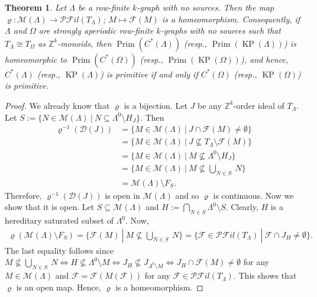 \documentclass[a4paper,reqno,12pt]{amsart}
\numberwithin{equation}{section}
\newtheorem{thm}{Theorem}[section]
\theoremstyle{definition}
\theoremstyle{remark}
\newcommand{\Prim}{\operatorname{Prim}}
\newcommand{\KP}{\operatorname{KP}}
\begin{document}
\begin{thm}\label{th TM detects primitive ideal space}
Let $\Lambda$ be a row-finite $k$-graph with no sources. Then the map $\varrho:\mathscr{M}(\Lambda)\longrightarrow \mathscr{P}\mathscr{F}il(T_\Lambda)$; $M\longmapsto \mathcal{F}(M)$ is a homeomorphism. Consequently, if $\Lambda$ and $\Omega$ are strongly aperiodic row-finite $k$-graphs with no sources such that $T_\Lambda\cong T_\Omega$ as $\mathbb{Z}^k$-monoids, then $\Prim(C^*(\Lambda))$ (resp., $\Prim(\KP(\Lambda))$) is homeomorphic to $\Prim(C^*(\Omega))$ (resp., $\Prim(\KP(\Omega))$), and hence, $C^*(\Lambda)$ (resp., $\KP(\Lambda)$) is primitive if and only if $C^*(\Omega)$ (resp., $\KP(\Omega)$) is primitive. 
\end{thm}
\begin{proof}
We already know that $\varrho$ is a bijection. Let $J$ be any $\mathbb{Z}^k$-order ideal of $T_\Lambda$. Let $S:=\{N\in \mathscr{M}(\Lambda)~|~N\subseteq \Lambda^0\setminus H_J\}$. Then
\allowdisplaybreaks
{\begin{align*}
\varrho^{-1}(\mathscr{D}(J))&=\{M\in \mathscr{M}(\Lambda)~|~J\cap \mathcal{F}(M)\neq \emptyset\}\\
&=\{M\in \mathscr{M}(\Lambda)~|~J\nsubseteq T_\Lambda\setminus \mathcal{F}(M)\}\\
&=\{M\in \mathscr{M}(\Lambda)~|~M\nsubseteq \Lambda^0\setminus H_J\}\\
&=\{M\in \mathscr{M}(\Lambda)~|~M\nsubseteq \displaystyle{\bigcup_{N\in S}}~N\}\\
&=\mathscr{M}(\Lambda)\setminus F_S.
\end{align*}
}
Therefore, $\varrho^{-1}(\mathscr{D}(J))$ is open in $\mathscr{M}(\Lambda)$ and so $\varrho$ is continuous. Now we show that it is open. Let $S\subseteq \mathscr{M}(\Lambda)$ and $H:=\displaystyle{\bigcap_{N\in S}}\Lambda^0\setminus S$. Clearly, $H$ is a hereditary saturated subset of $\Lambda^0$. Now, 
\begin{align*}
\varrho(\mathscr{M}(\Lambda)\setminus F_S)=\{\mathcal{F}(M)~|~M\nsubseteq \displaystyle{\bigcup_{N\in S}}~N\}=\{\mathcal{F}\in \mathscr{P}\mathscr{F}il(T_\Lambda)~|~\mathcal{F}\cap J_H\neq \emptyset\}.
\end{align*}
The last equality follows since $M\nsubseteq \displaystyle{\bigcup_{N\in S}}~N\Leftrightarrow H\nsubseteq \Lambda^0\setminus M\Leftrightarrow J_H\nsubseteq J_{\Lambda^0\setminus M}\Leftrightarrow J_H\cap \mathcal{F}(M)\neq \emptyset$ for any $M\in \mathscr{M}(\Lambda)$ and $\mathcal{F}=\mathcal{F}(M(\mathcal{F}))$ for any $\mathcal{F}\in \mathscr{P}\mathscr{F}il(T_\Lambda)$. This shows that $\varrho$ is an open map. Hence, $\varrho$ is a homeomorphism. 
\end{proof}
\end{document}
